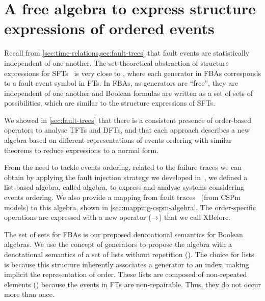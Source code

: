  \chapter{A free algebra to express structure expressions of ordered events}
\label{chap:algebra}

Recall from \cref{sec:time-relations,sec:fault-trees} that fault events are statistically independent of one another.
The set-theoretical abstraction of structure expressions for \acp{SFT}~\cite[pp. VI-11]{VGR+1981} is very close to , where each generator in \acp{FBA} corresponds to a fault event symbol in \aclp{FT}.
In \acp{FBA}, as generators are ``free'', they are independent of one another and Boolean formulas are written as a set of sets of possibilities, which are similar to the structure expressions of \acp{SFT}.

We showed in \cref{sec:fault-trees} that there is a consistent presence of order-based operators to analyse \acp{TFT} and \acp{DFT}, and that each approach describes a new algebra based on different representations of events ordering with similar theorems to reduce expressions to a normal form.

From the need to tackle events ordering, related to the failure traces we can obtain by applying the fault injection strategy we developed in~\cite{DM2012}, we defined a list-based algebra, called \acf{algebra}, to express and analyse systems considering events ordering.
We also provide a mapping from fault traces~\cite{DM2012} (from \ac{CSPm} models) to this algebra, shown in \cref{sec:mapping-cspm-algebra}.
The order-specific operations are expressed with a new operator ($\rightarrow$) that we call \ac{XBefore}.

The set of sets for \acp{FBA} is our proposed denotational semantics for Boolean algebras.
We use the concept of generators to propose the \ac{algebra} with a denotational semantics of a set of lists without repetition (\distinctlists).
The choice for lists is because this structure inherently associates a generator to an index, making implicit the representation of order.
These lists are composed of non-repeated elements (\distinctlists) because the events in \aclp{FT} are non-repairable.
Thus, they do not occur more than once.

